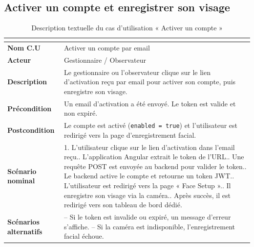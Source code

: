 \documentclass[12pt,a4paper]{report}
\numberwithin{figure}{chapter}
\numberwithin{table}{chapter}
\begin{document}
\subsection{Activer un compte et enregistrer son visage}

\begin{table}[H]
  \centering
  \caption{Description textuelle du cas d'utilisation « Activer un compte »}
  \label{tab:cu_activate}
  \renewcommand{\arraystretch}{1.4}
  \begin{tabularx}{\textwidth}{|>{\bfseries}l|L|}
    \hline
     \\
    \hline
    Nom C.U & Activer un compte par email \\
    \hline
    Acteur & Gestionnaire / Observateur \\
    \hline
    Description & Le gestionnaire ou l'observateur clique sur le lien d'activation reçu
      par email pour activer son compte, puis enregistre son visage. \\
    \hline
    Précondition & Un email d'activation a été envoyé. Le token est valide et non expiré. \\
    \hline
    Postcondition & Le compte est activé (\texttt{enabled = true}) et l'utilisateur est
      redirigé vers la page d'enregistrement facial. \\
    \hline
    Scénario nominal &
      1. L'utilisateur clique sur le lien d'activation dans l'email reçu.. L'application Angular extrait le token de l'URL.. Une requête POST est envoyée au backend pour valider le token.. Le backend active le compte et retourne un token JWT.. L'utilisateur est redirigé vers la page « Face Setup ».. Il enregistre son visage via la caméra.. Après succès, il est redirigé vers son tableau de bord dédié. \\
    \hline
    Scénarios alternatifs &
      -- Si le token est invalide ou expiré, un message d'erreur s'affiche.\newline
      -- Si la caméra est indisponible, l'enregistrement facial échoue. \\
    \hline
  \end{tabularx}
\end{table}
\end{document}
